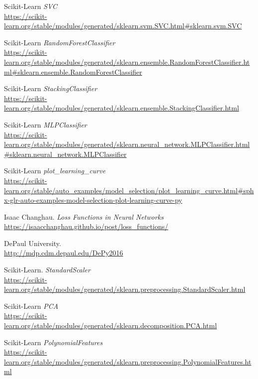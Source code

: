 \documentclass[11pt,a4paper]{article}
\begin{document}
\newpage

\begin{thebibliography}{}

    
    Scikit-Learn \textit{SVC}
    \\\url{https://scikit-learn.org/stable/modules/generated/sklearn.svm.SVC.html#sklearn.svm.SVC}
    
    Scikit-Learn \textit{RandomForestClassifier}
    \\\url{https://scikit-learn.org/stable/modules/generated/sklearn.ensemble.RandomForestClassifier.html#sklearn.ensemble.RandomForestClassifier}
    
    Scikit-Learn \textit{StackingClassifier}
    \\\url{https://scikit-learn.org/stable/modules/generated/sklearn.ensemble.StackingClassifier.html}
    
    Scikit-Learn \textit{MLPClassifier}
    \\\url{https://scikit-learn.org/stable/modules/generated/sklearn.neural_network.MLPClassifier.html#sklearn.neural_network.MLPClassifier}
    
    Scikit-Learn \textit{plot\_learning\_curve}
    \\\url{https://scikit-learn.org/stable/auto_examples/model_selection/plot_learning_curve.html#sphx-glr-auto-examples-model-selection-plot-learning-curve-py}
    
    Isaac Changhau. \textit{Loss Functions in Neural Networks}
    \\\url{https://isaacchanghau.github.io/post/loss_functions/}

    DePaul University.
    \\\url{http://mdp.cdm.depaul.edu/DePy2016}

    Scikit-Learn. \textit{StandardScaler}
    \\\url{https://scikit-learn.org/stable/modules/generated/sklearn.preprocessing.StandardScaler.html}
    
    Scikit-Learn \textit{PCA}
    \\\url{https://scikit-learn.org/stable/modules/generated/sklearn.decomposition.PCA.html}
    
    Scikit-Learn \textit{PolynomialFeatures}
    \\\url{https://scikit-learn.org/stable/modules/generated/sklearn.preprocessing.PolynomialFeatures.html}


\end{thebibliography}
\end{document}
